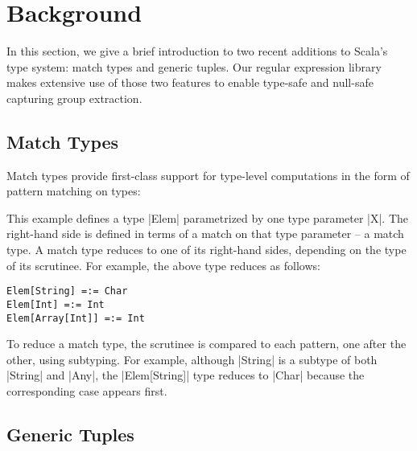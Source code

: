 
\section{Background}
\label{sec:background}

In this section, we give a brief introduction to two recent additions to Scala's type system: match types and generic tuples.
Our regular expression library makes extensive use of those two features to enable type-safe and null-safe capturing group extraction.

\subsection{Match Types}

Match types provide first-class support for type-level computations in the form of pattern matching on types:

\elemExample

\noindent
This example defines a type |Elem| parametrized by one type parameter |X|.
The right-hand side is defined in terms of a match on that type parameter -- a match type.
A match type reduces to one of its right-hand sides, depending on the type of its scrutinee.
For example, the above type reduces as follows:

\begin{lstlisting}
Elem[String] =:= Char
Elem[Int] =:= Int
Elem[Array[Int]] =:= Int
\end{lstlisting}

\noindent
To reduce a match type, the scrutinee is compared to each pattern, one after the other, using subtyping.
For example, although |String| is a subtype of both |String| and |Any|, the |Elem[String]| type reduces to |Char| because the corresponding case appears first.

\subsection{Generic Tuples}
\label{subsec:generic-tuples}

